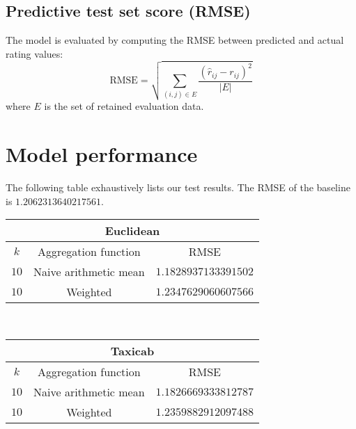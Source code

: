 \documentclass[final]{cvpr}
\begin{document}
\subsection{Predictive test set score (RMSE)}
The model is evaluated by computing the RMSE between predicted and actual rating values:
$$ \text{RMSE} = \sqrt{\sum_{(i, j) \in E} \frac{{(\hat r_{ij} - r_{ij})}^2}{\left| E \right|}} $$
where $E$ is the set of retained evaluation data.

\section{Model performance}
The following table exhaustively lists our test results.
The RMSE of the baseline is $1.2062313640217561$.


\begin{tabular}{| c | c | c |}
    \hline
    \multicolumn{3}{|c|}{\textbf{Euclidean}}\\
    \hline
    $k$ & Aggregation function & RMSE\\
    \hline
    $10$ & Naive arithmetic mean & $1.1828937133391502$\\
    \hline
    $10$ & Weighted & $1.2347629060607566$\\
    \hline
\end{tabular}\\

\hspace{2em}

\begin{tabular}{| c | c | c |}
    \hline
    \multicolumn{3}{|c|}{\textbf{Taxicab}}\\
    \hline
    $k$ & Aggregation function & RMSE\\
    \hline
    $10$ & Naive arithmetic mean & $1.1826669333812787$\\
    \hline
    $10$ & Weighted & $1.2359882912097488$\\
    \hline
\end{tabular}\\
\end{document}
